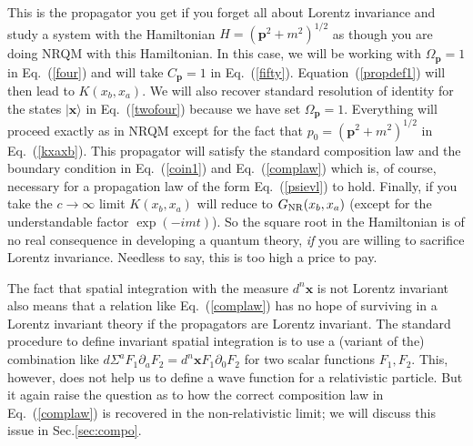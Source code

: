 \documentclass[12pt]{article}
\def\eq#1{{Eq.~(\ref{#1})}}
\def\ket#1{|#1\rangle}                    %
\begin{document}
This is the propagator you get if you forget all about Lorentz invariance and study a system with the Hamiltonian $H=(\bm{p}^2 + m^2)^{1/2}$ as though you are doing NRQM with this Hamiltonian. In this case,  we will be working with   $\Omega_{\bm p}=1$ in \eq{four} and will take $C_{\bm p}=1$ in \eq{fifty}. Equation~(\ref{propdef1}) will then lead to $K(x_b,x_a)$. We will also recover standard resolution of identity for the states $\ket{\bm{x}}$ in \eq{twofour} because we have set $\Omega_{\bm{p}} =1$. Everything will proceed exactly as in NRQM except for the fact that $p_0=(\bm{p}^2+m^2)^{1/2}$ in \eq{kxaxb}. This propagator will satisfy the standard composition law and the boundary condition in \eq{coin1} and \eq{complaw} which is, of course, necessary for a propagation law of the form \eq{psievl} to hold. Finally, if you take the $c\to \infty$ limit $K(x_b,x_a)$ will reduce to $G_{\rm NR}(x_b,x_a)$ (except for the understandable factor $\exp(-imt)$). So the square root in the Hamiltonian is of no real consequence in developing a quantum theory, \textit{if} you are willing to sacrifice Lorentz invariance. Needless to say, this is too high a price to pay. 

The fact that spatial integration with the measure $ d^n \bm{x}$
 is not Lorentz invariant also means that a relation like \eq{complaw} has no hope of surviving in a Lorentz invariant theory if the propagators are Lorentz invariant. The standard procedure to define invariant spatial integration is to use a (variant of the) combination like $d\Sigma^a F_1\partial_a F_2 =  d^n \bm{x} F_1\partial_0 F_2$ for two scalar functions $F_1,F_2$. This, however, does not help us to define a wave function for a relativistic particle. But it again raise the question as to how the correct composition law in \eq{complaw} is recovered in the non-relativistic limit; we will discuss this issue in Sec.\ref{sec:compo}.
 
\end{document}
